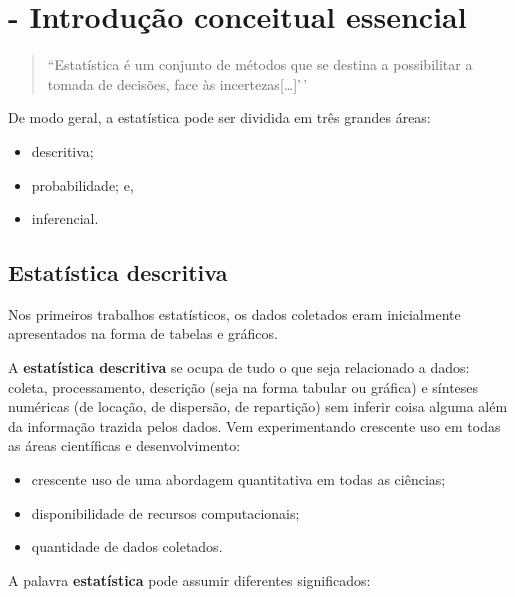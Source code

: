 \documentclass[
]{book}
\providecommand{\tightlist}{%
  \setlength{\itemsep}{0pt}\setlength{\parskip}{0pt}}
\begin{document}
\hypertarget{conceitos_gerais}{%
\chapter{- Introdução conceitual essencial}\label{conceitos_gerais}}

\begin{quote}
``Estatística é um conjunto de métodos que se destina a possibilitar a tomada de decisões, face às incertezas{[}\ldots{]}'\,'
\end{quote}

De modo geral, a estatística pode ser dividida em três grandes áreas:

\begin{itemize}
\tightlist
\item
  descritiva;
\item
  probabilidade; e,
\item
  inferencial.
\end{itemize}

\hypertarget{estatuxedstica-descritiva}{%
\section{Estatística descritiva}\label{estatuxedstica-descritiva}}

Nos primeiros trabalhos estatísticos, os dados coletados eram inicialmente apresentados na forma de tabelas e gráficos.

A \textbf{estatística descritiva} se ocupa de tudo o que seja relacionado a dados: coleta, processamento, descrição (seja na forma tabular ou gráfica) e sínteses numéricas (de locação, de dispersão, de repartição) sem inferir coisa alguma além da informação trazida pelos dados. Vem experimentando crescente uso em todas as áreas científicas e desenvolvimento:

\begin{itemize}
\tightlist
\item
  crescente uso de uma abordagem quantitativa em todas as ciências;
\item
  disponibilidade de recursos computacionais;
\item
  quantidade de dados coletados.
\end{itemize}

A palavra \textbf{estatística} pode assumir diferentes significados:
\end{document}

